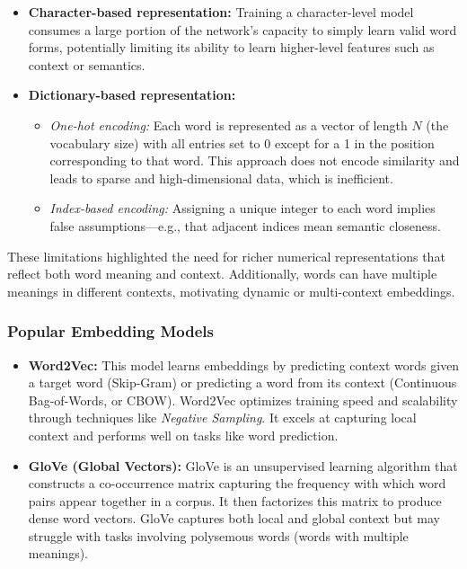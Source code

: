 \begin{itemize}
    \item \textbf{Character-based representation:} Training a character-level model consumes a large portion of the network's capacity to simply learn valid word forms, potentially limiting its ability to learn higher-level features such as context or semantics.
    
    \item \textbf{Dictionary-based representation:}
    \begin{itemize}
        \item \textit{One-hot encoding:} Each word is represented as a vector of length $N$ (the vocabulary size) with all entries set to 0 except for a 1 in the position corresponding to that word. This approach does not encode similarity and leads to sparse and high-dimensional data, which is inefficient.
        
        \item \textit{Index-based encoding:} Assigning a unique integer to each word implies false assumptions—e.g., that adjacent indices mean semantic closeness.
    \end{itemize}
\end{itemize}

These limitations highlighted the need for richer numerical representations that reflect both word meaning and context. Additionally, words can have multiple meanings in different contexts, motivating dynamic or multi-context embeddings.

\subsubsection*{Popular Embedding Models}

\begin{itemize}
    \item \textbf{Word2Vec:} This model learns embeddings by predicting context words given a target word (Skip-Gram) or predicting a word from its context (Continuous Bag-of-Words, or CBOW). Word2Vec optimizes training speed and scalability through techniques like \textit{Negative Sampling}. It excels at capturing local context and performs well on tasks like word prediction.
    
    \item \textbf{GloVe (Global Vectors):} GloVe is an unsupervised learning algorithm that constructs a co-occurrence matrix capturing the frequency with which word pairs appear together in a corpus. It then factorizes this matrix to produce dense word vectors. GloVe captures both local and global context but may struggle with tasks involving polysemous words (words with multiple meanings).
\end{itemize}

